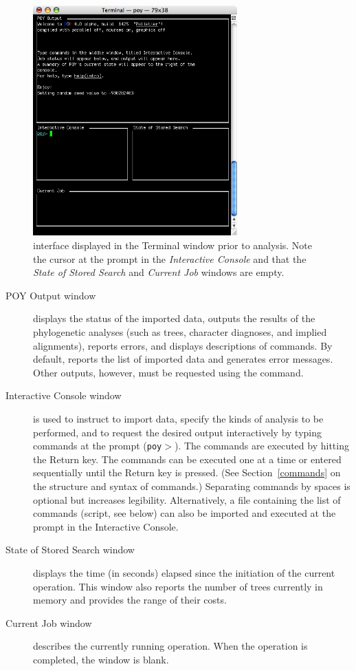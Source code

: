 \begin{figure}[htbp]
   \centering
   \includegraphics[width=0.7\textwidth]{figures/figinterface.jpg}
   \caption{\poy interface displayed in the Terminal window prior to analysis. Note the cursor at the \poy prompt in the \emph{Interactive Console} and that the \emph{State of Stored Search} and \emph{Current Job} windows are empty.}
   \label{fig:figinterface}
\end{figure}

\begin{description}
\item[POY Output window] displays the status of the imported data, outputs the results of the phylogenetic analyses (such as trees, character diagnoses, and implied alignments), reports errors, and displays descriptions of \poy commands. By default, \poy reports the list of imported data and generates error messages. Other outputs, however, must be requested using the  command.
\item[Interactive Console window]  is used to instruct \poy to import data, specify the kinds of analysis to be performed, and to request the desired output interactively by typing \poy commands at the \poy prompt (\texttt{poy$>$}). The commands are executed by hitting the Return key. The commands can be executed one at a time or entered sequentially until the Return key is pressed. (See Section~\ref{commands} on the structure and syntax of \poy commands.) Separating commands by spaces is optional but increases legibility. Alternatively, a file containing the list of commands (\poy script, see below) can also be imported and executed at the prompt in the Interactive Console.
\item[State of Stored Search window]  displays the time (in seconds) elapsed since the initiation of the current operation. This window also reports the number of trees currently in memory and provides the range of their costs.
\item[Current Job window] describes the currently running operation. When the operation is completed, the window is blank.
\end{description} 

